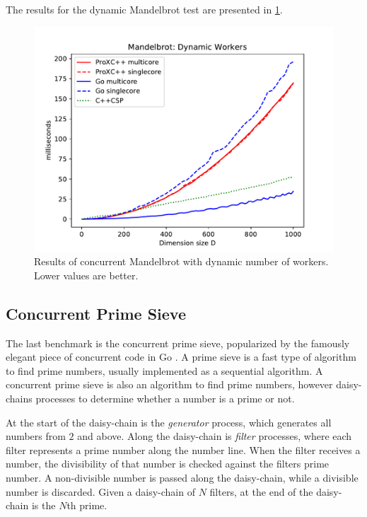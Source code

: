 The results for the dynamic Mandelbrot test are presented in \cref{fig:mandelbrot_dynamic}.  

\begin{figure}[h!]
    \centering
    \includegraphics[width=0.9\linewidth]{fig/mandelbrot_dynamic}
    \caption{Results of concurrent Mandelbrot with dynamic number of workers. Lower values are better.}
    \label{fig:mandelbrot_dynamic}
\end{figure}


\FloatBarrier
\subsection{Concurrent Prime Sieve}


The last benchmark is the concurrent prime sieve, popularized by the famously elegant piece of concurrent code in Go \citep{go2017primesieve}. A prime sieve is a fast type of algorithm to find prime numbers, usually implemented as a sequential algorithm. A concurrent prime sieve is also an algorithm to find prime numbers, however daisy\hyp{}chains processes to determine whether a number is a prime or not. 

At the start of the daisy\hyp{}chain is the \textit{generator} process, which generates all numbers from $2$ and above. Along the daisy\hyp{}chain is \textit{filter} processes, where each filter represents a prime number along the number line. When the filter receives a number, the divisibility of that number is checked against the filters prime number. A non\hyp{}divisible number is passed along the daisy\hyp{}chain, while a divisible number is discarded. Given a daisy\hyp{}chain of $N$ filters, at the end of the daisy\hyp{}chain is the $N$th prime.

